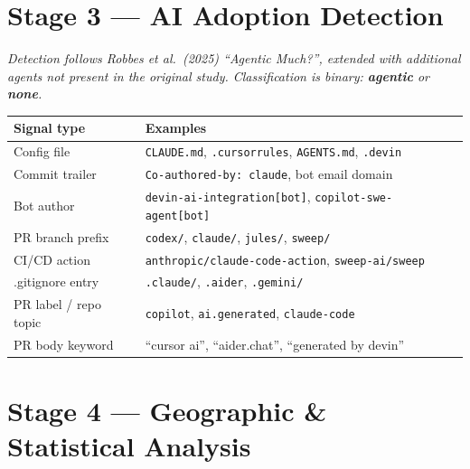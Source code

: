 \documentclass[9.5pt,a4paper]{article}
\begin{document}
\section{Stage 3 — AI Adoption Detection}

\textit{Detection follows Robbes et al.\ (2025) ``Agentic Much?'', extended with additional agents not present in the original study. Classification is binary: \textbf{agentic} or \textbf{none}.}

\vspace{4pt}
\begin{tabular}{@{}p{4cm} p{12.2cm}@{}}
\toprule
\textbf{Signal type} & \textbf{Examples} \\
\midrule
\rowcolor{rowgray}
Config file & \texttt{CLAUDE.md}, \texttt{.cursorrules}, \texttt{AGENTS.md}, \texttt{.devin} \\
Commit trailer & \texttt{Co-authored-by: claude}, bot email domain \\
\rowcolor{rowgray}
Bot author & \texttt{devin-ai-integration[bot]}, \texttt{copilot-swe-agent[bot]} \\
PR branch prefix & \texttt{codex/}, \texttt{claude/}, \texttt{jules/}, \texttt{sweep/} \\
\rowcolor{rowgray}
CI/CD action & \texttt{anthropic/claude-code-action}, \texttt{sweep-ai/sweep} \\
.gitignore entry & \texttt{.claude/}, \texttt{.aider}, \texttt{.gemini/} \\
\rowcolor{rowgray}
PR label / repo topic & \texttt{copilot}, \texttt{ai.generated}, \texttt{claude-code} \\
PR body keyword & ``cursor ai'', ``aider.chat'', ``generated by devin'' \\
\bottomrule
\end{tabular}





\section{Stage 4 — Geographic \& Statistical Analysis}
\end{document}
